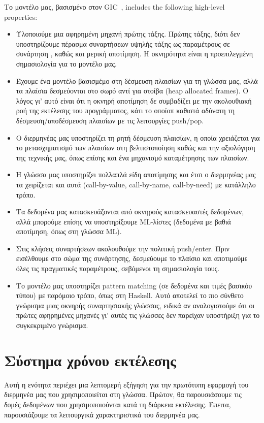 \documentclass[diploma]{softlab-thesis}
\begin{document}
Το μοντέλο μας, βασισμένο στον  GIC~\cite{Fourtounis14}, 
includes the following high-level properties:
\begin{itemize}
\item Υλοποιούμε μια  αφηρημένη μηχανή πρώτης τάξης. Πρώτης τάξης, διότι δεν υποστηρίζουμε πέρασμα συναρτήσεων υψηλής τάξης ως παραμέτρους σε συνάρτηση
, καθώς και μερική αποτίμηση. Η οκνηρότητα είναι η προεπιλεγμένη σημασιολογία για το μοντέλο μας.
\item Έχουμε ένα μοντέλο βασισμέμο στη δέσμευση πλαισίων για τη γλώσσα μας, αλλά τα πλαίσια δεσμεύονται στο σωρό αντί για στοίβα (heap allocated frames).
Ο λόγος γι' αυτό είναι ότι η οκνηρή αποτίμηση δε συμβαδίζει με την ακολουθιακή ροή της εκτέλεσης του προγράμματος, κάτι το οποίοπ καθιστά αδύνατη 
τη δέσμευση/αποδέσμευση πλαισίων με τις λειτουργίες push/pop.
\item Ο διερμηνέας μας υποστηρίζει τη ρητή δέσμευση πλαισίων, η οποία χρειάζεται για το μετασχηματισμό των πλαισίων στη βελτιστοποίηση 
καθώς και την αξιολόγηση της τεχνικής μας, όπως επίσης και ένα μηχανισμό καταμέτρησης των πλαισίων.
\item Η γλώσσα μας  υποστηρίζει πολλαπλά είδη αποτίμησης και έτσι ο διερμηνέας μας τα χειρίζεται και αυτά (call-by-value, call-by-name, call-by-need)
με κατάλληλο τρόπο.
\item Τα δεδομένα μας κατασκευάζονται από οκνηρούς κατασκευαστές δεδομένων, αλλά μπορούμε επίσης να υποστηρίξουμε ML-λίστες (δεδομένα με βαθιά αποτίμηση, όπως στη γλώσσα ML).
\item Στις κλήσεις συναρτήσεων ακολουθούμε την πολιτική push/enter. Πριν εισέλθουμε στο σώμα της συνάρτησης,
δεσμεύουμε το πλαίσιο και αποτιμούμε όλες τις πραγματικές παραμέτρους, σεβόμενοι τη σημασιολογία τους.
\item Το μοντέλο μας υποστηρίζει pattern matching (σε δεδομένα και τιμές βασικόυ τύπου) με παρόμοιο τρόπο, όπως στη Haskell. 
Αυτό αποτελεί το πιο σύνθετο γνώρισμα μιας οκνηρής συναρτησιακής γλώσσας, ειδικά αν αναλογιστούμε ότι οι πρώτες αφηρημένες μηχανές γι' αυτές τις γλώσσες δεν παρείχαν 
υποστήριξη για το συγκεκριμένο γνώρισμα.
\end{itemize}

\section{Σύστημα χρόνου εκτέλεσης}

Αυτή η ενότητα περιέχει μια λεπτομερή εξήγηση για την πρωτότυπη εφαρμογή του διερμηνέα μας
που χρησιμοποιείται στη γλώσσα. Πρώτον, θα παρουσιάσουμε τις δομές δεδομένων που χρησιμοποιούνται κατά τη διάρκεια εκτέλεσης. Έπειτα,
παρουσιάζουμε τα λειτουργικά χαρακτηριστικά του διερμηνέα μας.
\end{document}
